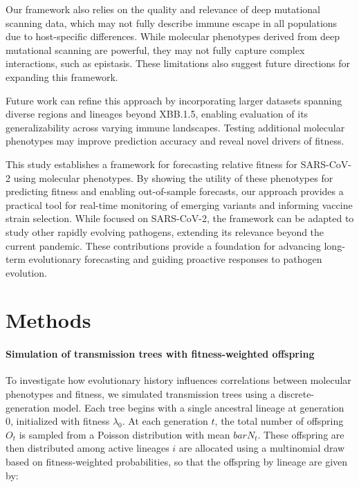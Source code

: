 Our framework also relies on the quality and relevance of deep mutational scanning data, which may not fully describe immune escape in all populations due to host-specific differences.
While molecular phenotypes derived from deep mutational scanning are powerful, they may not fully capture complex interactions, such as epistasis.
These limitations also suggest future directions for expanding this framework.

Future work can refine this approach by incorporating larger datasets spanning diverse regions and lineages beyond XBB.1.5, enabling evaluation of its generalizability across varying immune landscapes. Testing additional molecular phenotypes may improve prediction accuracy and reveal novel drivers of fitness.

This study establishes a framework for forecasting relative fitness for SARS-CoV-2 using molecular phenotypes.
By showing the utility of these phenotypes for predicting fitness and enabling out-of-sample forecasts, our approach provides a practical tool for real-time monitoring of emerging variants and informing vaccine strain selection. 
While focused on SARS-CoV-2, the framework can be adapted to study other rapidly evolving pathogens, extending its relevance beyond the current pandemic.
These contributions provide a foundation for advancing long-term evolutionary forecasting and guiding proactive responses to pathogen evolution.

\section{Methods}

\paragraph{Simulation of transmission trees with fitness-weighted offspring}%

To investigate how evolutionary history influences correlations between molecular phenotypes and fitness, we simulated transmission trees using a discrete-generation model.
Each tree begins with a single ancestral lineage at generation 0, initialized with fitness $\lambda_0$.
At each generation $t$, the total number of offspring $O_{t}$ is sampled from a Poisson distribution with mean $bar{N}_t$.
These offspring are then distributed among active lineages $i$ are allocated using a multinomial draw based on fitness-weighted probabilities, so that the offspring by lineage are given by:

